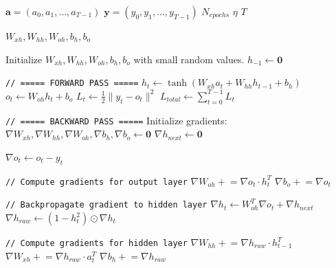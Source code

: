 \begin{algorithm}[H]
\caption{Backpropagation Through Time (BPTT)}
\label{alg:bptt}
\small

\begin{algorithmic}[1]

\Inputs
\Statex $\mathbf{a} = (a_0, a_1, \dots, a_{T-1})$ 
\Statex $\mathbf{y} = (y_0, y_1, \dots, y_{T-1})$ 
\Statex $N_{epochs}$ 
\Statex $\eta$ 
\Statex $T$ 

\Outputs
\Statex $W_{xh}, W_{hh}, W_{oh}, b_h, b_o$ 

\Initialization
\State Initialize $W_{xh}, W_{hh}, W_{oh}, b_h, b_o$ with small random values.
\State $h_{-1} \leftarrow \mathbf{0}$ 

\Statex \texttt{// ===== FORWARD PASS =====}
\State $h_t \leftarrow \tanh(W_{xh} a_t + W_{hh} h_{t-1} + b_h)$ 
\State $o_t \leftarrow W_{oh} h_t + b_o$
\State $L_t \leftarrow \frac{1}{2} \| y_t - o_t \|^2$ 
\EndFor
\State $L_{total} \leftarrow \sum_{t=0}^{T-1} L_t$ 

\Statex
\Statex \texttt{// ===== BACKWARD PASS =====}
\State Initialize gradients: $\nabla W_{xh}, \nabla W_{hh}, \nabla W_{oh}, \nabla b_h, \nabla b_o \leftarrow \mathbf{0}$
\State $\nabla h_{next} \leftarrow \mathbf{0}$ 

 
\State $\nabla o_t \leftarrow o_t - y_t$ 

\Statex \texttt{// Compute gradients for output layer}
\State $\nabla W_{oh} \mathrel{+}= \nabla o_t \cdot h_t^T$
\State $\nabla b_o \mathrel{+}= \nabla o_t$

\Statex \texttt{// Backpropagate gradient to hidden layer}
\State $\nabla h_t \leftarrow W_{oh}^T \nabla o_t + \nabla h_{next}$
\State $\nabla h_{raw} \leftarrow (1 - h_t^2) \odot \nabla h_t$ 

\Statex \texttt{// Compute gradients for hidden layer}
\State $\nabla W_{hh} \mathrel{+}= \nabla h_{raw} \cdot h_{t-1}^T$
\State $\nabla W_{xh} \mathrel{+}= \nabla h_{raw} \cdot a_t^T$
\State $\nabla b_h \mathrel{+}= \nabla h_{raw}$


\end{algorithmic}
\end{algorithm}
